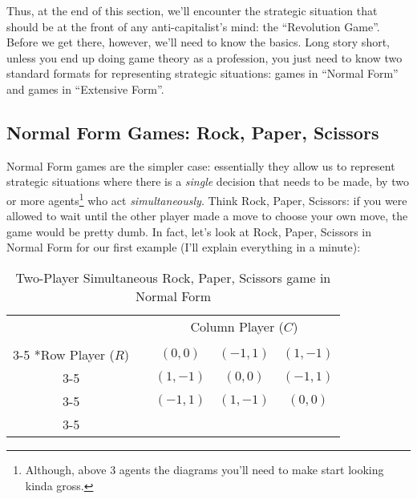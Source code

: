 Thus, at the end of this section, we'll encounter the strategic situation that should be at the front of any anti-capitalist's mind: the ``Revolution Game''. Before we get there, however, we'll need to know the basics. Long story short, unless you end up doing game theory as a profession, you just need to know two standard formats for representing strategic situations: games in ``Normal Form'' and games in ``Extensive Form''.

\subsection{Normal Form Games: Rock, Paper, Scissors}

Normal Form games are the simpler case: essentially they allow us to represent strategic situations where there is a \textit{single} decision that needs to be made, by two or more agents\footnote{Although, above 3 agents the diagrams you'll need to make start looking kinda gross.} who act \textit{simultaneously}. Think Rock, Paper, Scissors: if you were allowed to wait until the other player made a move to choose your own move, the game would be pretty dumb. In fact, let's look at Rock, Paper, Scissors in Normal Form for our first example (I'll explain everything in a minute):

\begin{table}[ht!]
	\centering
	\setlength{\extrarowheight}{2pt}
	\begin{tabular}{cc|c|c|c|}
		& \multicolumn{1}{c}{} & \multicolumn{3}{c}{Column Player ($C$)}\\
		& \multicolumn{1}{c}{} & \multicolumn{1}{c}{\strat{Rock}}  & \multicolumn{1}{c}{\strat{Paper}} & \multicolumn{1}{c}{\strat{Scissors}} \\\cline{3-5}
		\multirow{3}*{Row Player ($R$)}  & \strat{Rock} & $(0,0)$ & $(-1,1)$ & $(1,-1)$ \\\cline{3-5}
		& \strat{Paper} & $(1,-1)$ & $(0,0)$ & $(-1,1)$ \\\cline{3-5}
		& \strat{Scissors} & $(-1,1)$ & $(1,-1)$ & $(0,0)$ \\\cline{3-5}
	\end{tabular}
	\label{fig:rps2}
	\caption{Two-Player Simultaneous Rock, Paper, Scissors game in Normal Form}
\end{table}

